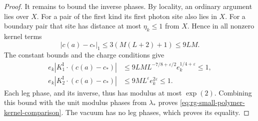 \begin{proof}
It remains to bound the inverse phases. By locality,
an ordinary argument lies over $X$. For a pair of the
first kind its first photon site also lies in $X$.
For a boundary pair that site has distance at most
$\eta_k\le1$ from $X$. Hence in all nonzero kernel terms
\[
 |c(a)-c_*|_1\le3(M(L+2)+1)\le9LM.
\]
The constant bounds and the charge conditions give
\[
 \begin{split}
 e_k|K_1^{\mathrm I}\cdot(c(a)-c_*)|
       &\le9LM L^{-7/8+\varepsilon/2}e_k^{1/4+\varepsilon}
                                                    \le1,\\
 e_k|K_2^{\mathrm I}\cdot(c(a)-c_*)|
       &\le9ML^\varepsilon e_k^{2\varepsilon}\le1.
 \end{split}
\]
Each leg phase, and its inverse, thus has modulus at most
$\exp(2)$. Combining this bound with the unit modulus
phases from $\lambda_*$ proves
\eqref{eq:rg-small-polymer-kernel-comparison}.
The vacuum has no leg phases, which proves its equality.
\end{proof}
